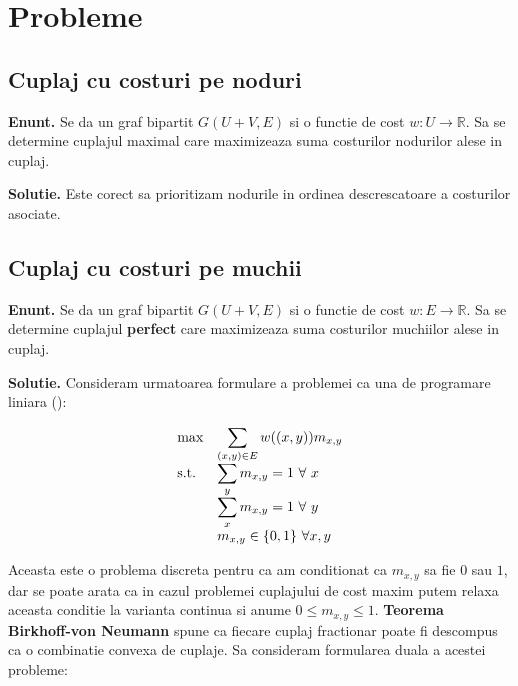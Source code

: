 \chapter{Probleme}

\section{Cuplaj cu costuri pe noduri}

\noindent \textbf{Enunt.} Se da un graf bipartit $G(U + V, E)$ si o functie de cost $w \colon U \to \mathbb{R}$. Sa se determine cuplajul
maximal care maximizeaza suma costurilor nodurilor alese in cuplaj.

\noindent \textbf{Solutie.} Este corect sa prioritizam nodurile in ordinea descrescatoare a costurilor asociate.

\pagebreak

\section{Cuplaj cu costuri pe muchii}

\noindent \textbf{Enunt.} Se da un graf bipartit $G(U + V, E)$ si o functie de cost $w \colon E \to \mathbb{R}$. Sa se determine cuplajul
\textbf{perfect} care maximizeaza suma costurilor muchiilor alese in cuplaj.

\noindent \textbf{Solutie.} Consideram urmatoarea formulare a problemei ca una de programare liniara (\cite{assignmentlp}):

\begin{equation*}
\begin{array}{ll@{}ll}
  \text{max}  & \displaystyle\sum\limits_{(x, y) \in E} w((x, y))m_{x, y} &\\
  \text{s.t.} & \displaystyle\sum\limits_{y} m_{x, y} = 1 \ \forall \ x &\\
              & \displaystyle\sum\limits_{x} m_{x, y} = 1 \ \forall \ y &\\
              & m_{x,y} \in \{0, 1\} \ \forall x, y
\end{array}
\end{equation*}

Aceasta este o problema discreta pentru ca am conditionat ca $m_{x, y}$ sa fie $0$ sau $1$, dar se poate arata ca in cazul problemei cuplajului
de cost maxim putem relaxa aceasta conditie la varianta continua si anume $0 \leq m_{x, y} \leq 1$. \textbf{Teorema Birkhoff-von Neumann} spune
ca fiecare cuplaj fractionar poate fi descompus ca o combinatie convexa de cuplaje. Sa consideram formularea duala a acestei probleme:

